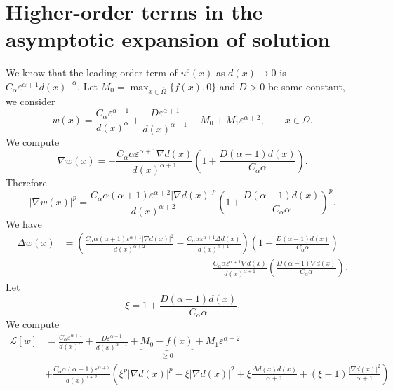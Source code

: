 \documentclass[10pt]{article}
\theoremstyle{plain}
\theoremstyle{remark}
\begin{document}
\section{Higher-order terms in the asymptotic expansion of solution}
We know that the leading order term of $u^\varepsilon(x)$ as $d(x)\to 0$ is $C_\alpha \varepsilon^{\alpha+1}d(x)^{-\alpha}$. Let $M_0 = \max_{x    \in\overline{\Omega}} \{f(x),0\}$ and $D>0$ be some constant, we consider
\begin{equation*}
    w(x) = \frac{C_\alpha \varepsilon^{\alpha+1}}{d(x)^\alpha} + \frac{D\varepsilon^{\alpha+1}}{d(x)^{\alpha-1}} + M_0 + M_1\varepsilon^{\alpha+2}, \qquad x\in \Omega.
\end{equation*}
We compute
\begin{equation*}
    \nabla w(x)  = -\frac{C_\alpha\alpha \varepsilon^{\alpha+1}\nabla d(x)}{d(x)^{\alpha+1}}\left(1+\frac{D(\alpha-1)d(x)}{C_\alpha \alpha}\right).
\end{equation*}
Therefore
\begin{equation*}
    |\nabla w(x)|^p  = \frac{C_\alpha\alpha(\alpha+1) \varepsilon^{\alpha+2}|\nabla d(x)|^p}{d(x)^{\alpha+2}}\left(1+\frac{D(\alpha-1)d(x)}{C_\alpha \alpha}\right)^p.
\end{equation*}
We have
\begin{equation*}
\begin{split}
    \Delta w(x) &= \left(\frac{C_\alpha\alpha(\alpha+1)\varepsilon^{\alpha+1}|\nabla d(x)|^2}{d(x)^{\alpha+2}} - \frac{C_\alpha\alpha\varepsilon^{\alpha+1}\Delta d(x)}{d(x)^{\alpha+1}}\right)\left(1+\frac{D(\alpha-1)d(x)}{C_\alpha \alpha}\right)\\
    & \qquad\qquad\qquad\qquad\qquad\qquad\qquad -\frac{C_\alpha\alpha \varepsilon^{\alpha+1}\nabla d(x)}{d(x)^{\alpha+1}}\left(\frac{D(\alpha-1)\nabla d(x)}{C_\alpha \alpha}\right).
\end{split}    
\end{equation*}
Let
\begin{equation*}
    \xi = 1+\frac{D(\alpha-1)d(x)}{C_\alpha\alpha}.
\end{equation*}
We compute
\begin{equation*}
    \begin{split}
        \mathcal{L}[w] &= \frac{C_\alpha \varepsilon^{\alpha+1}}{d(x)^\alpha} + \frac{D\varepsilon^{\alpha+1}}{d(x)^{\alpha-1}} + \underbrace{M_0 - f(x)}_{\geq 0} + M_1\varepsilon^{\alpha+2} \\
        &+ \frac{C_\alpha \alpha(\alpha+1)\varepsilon^{\alpha+2}}{d(x)^{\alpha+2}}\left(\xi^p|\nabla d(x)|^p  - \xi |\nabla d(x)|^2 + \xi\frac{\Delta d(x)d(x)}{\alpha+1}+(\xi-1)\frac{|\nabla d(x)|^2}{\alpha+1} \right)
    \end{split}
\end{equation*}
\end{document}
